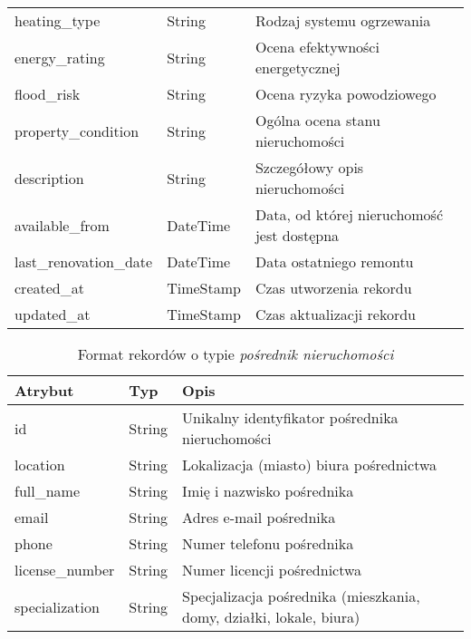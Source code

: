 \begin{table}[H]
\begin{tabular}{|l|l|l|}
    heating\_type & String & Rodzaj systemu ogrzewania \\
    energy\_rating & String & Ocena efektywności energetycznej \\
    flood\_risk & String & Ocena ryzyka powodziowego \\
    property\_condition & String & Ogólna ocena stanu nieruchomości \\
    description & String & Szczegółowy opis nieruchomości \\
    available\_from & DateTime & Data, od której nieruchomość jest dostępna \\
    last\_renovation\_date & DateTime & Data ostatniego remontu \\
    created\_at & TimeStamp & Czas utworzenia rekordu \\
    updated\_at & TimeStamp & Czas aktualizacji rekordu \\
    \hline
    \end{tabular}
    \label{tab:property_details}
\end{table}

\begin{table}[H]
    \caption{Format rekordów o typie \textit{pośrednik nieruchomości}}
    \centering
    \begin{tabular}{|l|l|l|}
    \hline
    \textbf{Atrybut} & \textbf{Typ} & \textbf{Opis} \\
    \hline
    id & String & Unikalny identyfikator pośrednika nieruchomości \\
    location & String & Lokalizacja (miasto) biura pośrednictwa \\
    full\_name & String & Imię i nazwisko pośrednika \\
    email & String & Adres e-mail pośrednika \\
    phone & String & Numer telefonu pośrednika \\
    license\_number & String & Numer licencji pośrednictwa \\
    specialization & String & Specjalizacja pośrednika (mieszkania, domy, działki, lokale, biura) \\ 
    \hline
    \end{tabular}
    \label{tab:agent_details}
\end{table}

